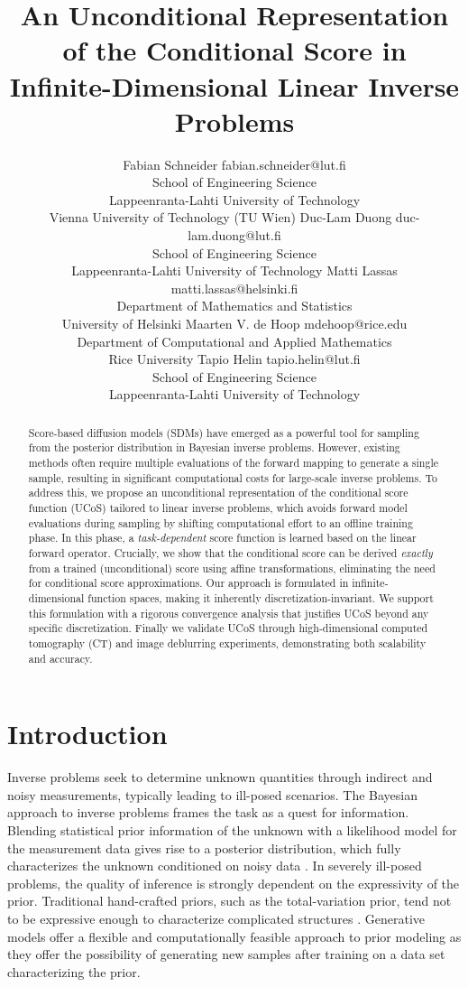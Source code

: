 \documentclass[10pt]{article} %
\title{An Unconditional Representation of the Conditional Score in Infinite-Dimensional Linear Inverse Problems}
\author{\name Fabian Schneider \email fabian.schneider@lut.fi \\
      \addr School of Engineering Science\\
      Lappeenranta-Lahti University of Technology \\%
      Vienna University of Technology (TU Wien)
      \AND
      \name Duc-Lam Duong \email duc-lam.duong@lut.fi \\
      \addr School of Engineering Science\\
      Lappeenranta-Lahti University of Technology %
      \AND
      \name Matti Lassas \email matti.lassas@helsinki.fi\\
      \addr Department of Mathematics and Statistics\\
      University of Helsinki %
      \AND 
      \name Maarten V. de Hoop \email mdehoop@rice.edu \\
      \addr Department of Computational and Applied Mathematics\\
      Rice University %
      \AND
      \name Tapio Helin \email tapio.helin@lut.fi \\
      \addr School of Engineering Science\\
      Lappeenranta-Lahti University of Technology %
      }
\theoremstyle{plain}
\theoremstyle{definition}
\theoremstyle{remark}
\newcommand{\duclam}[1]{#1}%
\begin{document}
\def\month{11}  %
\def\year{2025} %
\def\openreview{\url{https://openreview.net/forum?id=rO8erhXHPo}} %


\maketitle

\begin{abstract}
Score-based diffusion models (SDMs) have emerged as a powerful tool for sampling from the posterior distribution in Bayesian inverse problems. However, existing methods often require multiple evaluations of the forward mapping to generate a single sample, resulting in significant computational costs for large-scale inverse problems. To address this, we propose an unconditional representation of the conditional score function (UCoS) tailored to linear inverse problems, which avoids forward model evaluations during sampling by shifting computational effort to an offline training phase. In this phase, a \emph{task-dependent} score function is learned based on the linear forward operator. Crucially, we show that the conditional score can be derived \emph{exactly} from a trained (unconditional) score using affine transformations, eliminating the need for conditional score approximations. Our approach is formulated in infinite-dimensional function spaces, making it inherently discretization-invariant. We support this formulation with a rigorous convergence analysis that justifies UCoS beyond any specific discretization. Finally we validate UCoS through high-dimensional computed tomography (CT) and image deblurring experiments, demonstrating both scalability and accuracy.
\end{abstract}

\section{Introduction}

Inverse problems seek to determine unknown quantities through indirect and noisy measurements, typically leading to ill-posed scenarios.
The Bayesian approach to inverse problems frames the task as a quest for information. Blending statistical prior information of the unknown with a likelihood model for the measurement data gives rise to a posterior distribution, which fully characterizes the unknown conditioned on noisy data \cite{kaipio2006statistical, stuart2010inverse}. In severely ill-posed problems, the quality of inference is strongly dependent on the expressivity of the prior. Traditional hand-crafted priors, such as the total-variation prior, tend not to be expressive enough to characterize complicated structures \cite{sun2023provable}.
Generative models offer a flexible and computationally feasible approach to prior modeling as they offer the possibility of generating new samples after training on a data set characterizing the prior.
\end{document}
